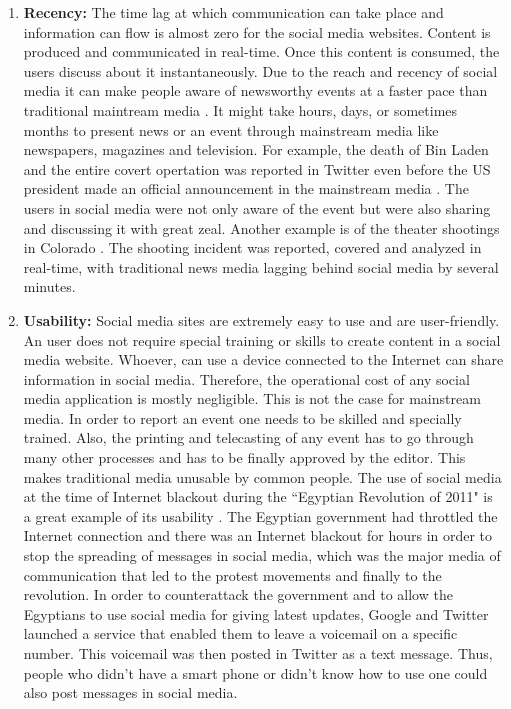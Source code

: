 \begin{enumerate}
\item \textbf{Recency:} The time lag at which communication can take place and information can flow is almost zero for the social media websites. Content is produced and communicated in real-time. Once this content is consumed, the users discuss about it instantaneously. Due to the reach and recency of social media it can make people aware of newsworthy events at a faster pace than traditional maintream media \cite{phelan2009using,petrovic2013can}. It might take hours, days, or sometimes months to present news or an event through mainstream media like newspapers, magazines and television. For example, the death of Bin Laden and the entire covert opertation was reported in Twitter even before the US president made an official announcement in the mainstream media \cite{ladendeathnews}. The users in social media were not only aware of the event but were also sharing and discussing it with great zeal.  Another example is of the theater shootings in Colorado \cite{coloradoshooting}. The shooting incident was reported, covered and analyzed in real-time, with traditional news media lagging behind social media by several minutes.

\item \textbf{Usability:} Social media sites are extremely easy to use and are user-friendly. An user does not require special training or skills to create content in a social media website. Whoever, can use a device connected to the Internet can share information in social media. Therefore, the operational cost of any social media application is mostly negligible. This is not the case for mainstream media. In order to report an event one needs to be skilled and specially trained. Also, the printing and telecasting of any event has to go through many other processes and has to be finally approved by the editor. This makes traditional media unusable by common people. The use of social media at the time of Internet blackout during the ``Egyptian Revolution of 2011" is a great example of its usability \cite{egyptianrevinternetblackout}. The Egyptian government had throttled the Internet connection and there was an Internet blackout for hours in order to stop the spreading of messages in social media, which was the major media of communication that led to the protest movements and finally to the revolution. In order to counterattack the government and to allow the Egyptians to use social media for giving latest updates, Google and Twitter launched a service that enabled them to leave a voicemail on a specific number. This voicemail was then posted in Twitter as a text message. Thus, people who didn't have a smart phone or didn't know how to use one could also post messages in social media.


\end{enumerate}

